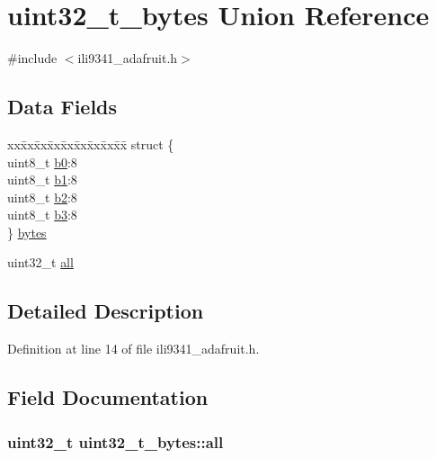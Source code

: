 \hypertarget{unionuint32__t__bytes}{\section{uint32\-\_\-t\-\_\-bytes Union Reference}
\label{unionuint32__t__bytes}
}


{\ttfamily \#include $<$ili9341\-\_\-adafruit.\-h$>$}

\subsection*{Data Fields}
\begin{DoxyCompactItemize}
\item 
\begin{tabbing}
xx\=xx\=xx\=xx\=xx\=xx\=xx\=xx\=xx\=\kill
struct \{\\
\>uint8\_t \hyperlink{unionuint32__t__bytes_a92b86537decb69327191d870f41c60f7}{b0}:8\\
\>uint8\_t \hyperlink{unionuint32__t__bytes_a91fb31482a2ce44b454fca964dcd556b}{b1}:8\\
\>uint8\_t \hyperlink{unionuint32__t__bytes_a462312b99de0c6d1c497064902196e1d}{b2}:8\\
\>uint8\_t \hyperlink{unionuint32__t__bytes_abd7739cae59fab7cf712d53f337b378a}{b3}:8\\
\} \hyperlink{unionuint32__t__bytes_a50aeebe398ee3b740421f1cc8d8583b8}{bytes}\\

\end{tabbing}\item 
uint32\-\_\-t \hyperlink{unionuint32__t__bytes_a83b0c87830b60d185365dbadf8efd4a0}{all}
\end{DoxyCompactItemize}


\subsection{Detailed Description}


Definition at line 14 of file ili9341\-\_\-adafruit.\-h.



\subsection{Field Documentation}
\hypertarget{unionuint32__t__bytes_a83b0c87830b60d185365dbadf8efd4a0}{
\subsubsection[{all}]{\setlength{\rightskip}{0pt plus 5cm}uint32\-\_\-t uint32\-\_\-t\-\_\-bytes\-::all}}\label{unionuint32__t__bytes_a83b0c87830b60d185365dbadf8efd4a0}


